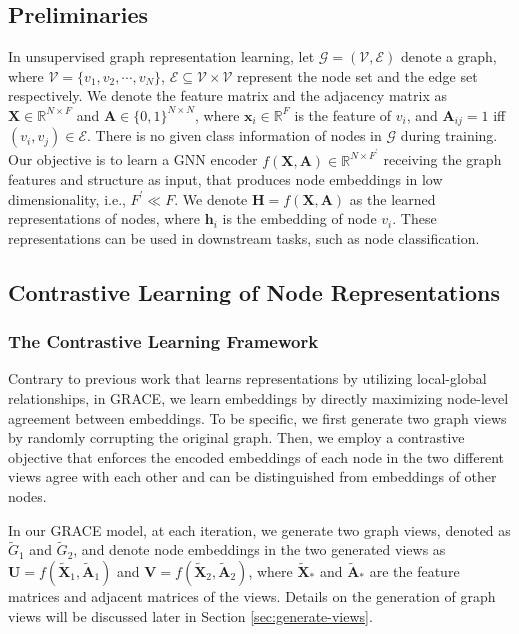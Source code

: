 \documentclass{article}
\theoremstyle{remark}
\begin{document}
\subsection{Preliminaries}
In unsupervised graph representation learning, let \(\mathcal{G} = (\mathcal{V}, \mathcal{E})\) denote a graph, where \(\mathcal{V} = \{ v_1, v_2, \cdots, v_N\}\), \(\mathcal{E} \subseteq \mathcal V \times \mathcal V\) represent the node set and the edge set respectively. We denote the feature matrix and the adjacency matrix as \(\bm{X} \in \mathbb{R}^{N \times F}\) and \(\bm{A} \in \{0,1\}^{N \times N}\), where \(\bm{x}_i \in \mathbb{R}^{F}\) is the feature of \(v_i\), and \(\bm{A}_{ij} = 1\) iff \((v_i, v_j) \in \mathcal{E}\).
There is no given class information of nodes in \(\mathcal{G}\) during training.
Our objective is to learn a GNN encoder \(f(\bm{X}, \bm{A}) \in \mathbb{R}^{N \times F^\prime}\) receiving the graph features and structure as input, that produces node embeddings in low dimensionality, i.e., \(F^\prime \ll F\). We denote \(\bm{H} = f(\bm{X}, \bm{A})\) as the learned representations of nodes, where \(\bm{h}_i\) is the embedding of node \(v_i\). These representations can be used in downstream tasks, such as node classification.



\subsection{Contrastive Learning of Node Representations}

\subsubsection{The Contrastive Learning Framework} 

Contrary to previous work that learns representations by utilizing local-global relationships, in GRACE, we learn embeddings by directly maximizing node-level agreement between embeddings.
To be specific, we first generate two graph views by randomly corrupting the original graph. Then, we employ a contrastive objective that enforces the encoded embeddings of each node in the two different views agree with each other and can be distinguished from embeddings of other nodes.





In our GRACE model, at each iteration, we generate two graph views, denoted as \(\widetilde{G}_1\) and \(\widetilde G_2\), and denote node embeddings in the two generated views as \(\bm{U} = f(\widetilde{\bm{X}}_1, \widetilde{\bm A}_1)\) and \(\bm{V} = f(\widetilde{\bm{X}}_2, \widetilde{\bm A}_2)\), where \(\widetilde{\bm{X}}_{*}\) and \(\widetilde{\bm{A}}_{*}\) are the feature matrices and adjacent matrices of the views.
Details on the generation of graph views will be discussed later in Section \ref{sec:generate-views}.
\end{document}
